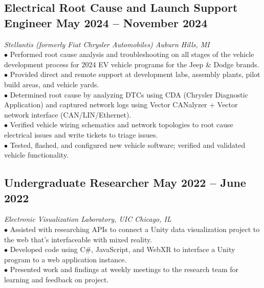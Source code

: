 \documentclass{article}
\begin{document}
\subsection{Electrical Root Cause and Launch Support Engineer \hfill \textnormal{May 2024 -- November 2024}}
\vspace{-0.5em}
\textit{Stellantis (formerly Fiat Chrysler Automobiles) \hfill Auburn Hills, MI}
\\
$\bullet$ Performed root cause analysis and troubleshooting on all stages of the vehicle development process for 2024 EV vehicle programs for the Jeep \& Dodge brands.
\\
$\bullet$ Provided direct and remote support at development labs, assembly plants, pilot build areas, and vehicle yards.
\\
$\bullet$ Determined root cause by analyzing DTCs using CDA (Chrysler Diagnostic Application) and captured network logs using Vector CANalyzer + Vector network interface (CAN/LIN/Ethernet).
\\
$\bullet$ Verified vehicle wiring schematics and network topologies to root cause electrical issues and write tickets to triage issues.
\\
$\bullet$ Tested, flashed, and configured new vehicle software; verified and validated vehicle functionality.
\vspace{-0.5em}

\subsection{Undergraduate Researcher \hfill \textnormal{May 2022 -- June 2022}}
\vspace{-0.5em}
\textit{Electronic Visualization Laboratory, UIC \hfill Chicago, IL}
\\
$\bullet$ Assisted with researching APIs to connect a Unity data visualization project to the web that's interfaceable with mixed reality.
\\
$\bullet$ Developed code using C\#, JavaScript, and WebXR to interface a Unity program to a web application instance.
\\
$\bullet$ Presented work and findings at weekly meetings to the research team for learning and feedback on project.
\vspace{-0.5em}
\end{document}
